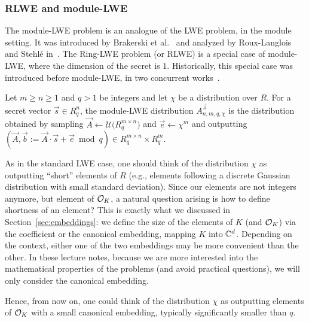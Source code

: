 \subsubsection{RLWE and module-LWE}


The module-LWE problem is an analogue of the LWE problem, in the module setting. It was introduced by Brakerski et al.~\cite{MLWE1} and analyzed by Roux-Langlois and Stehlé in~\cite{MLWE2}. The Ring-LWE problem (or RLWE) is a special case of module-LWE, where the dimension of the secret is $1$. Historically, this special case was introduced before module-LWE, in two concurrent works~\cite{RLWE1, RLWE2}.

\begin{definition}
Let $m \geq n \geq 1$ and $q > 1$ be integers and let $\chi$ be a distribution over $R$. For a secret vector $\vec s \in R_q^n$, the module-LWE distribution $A^{\vec s}_{n,m,q,\chi}$ is the distribution obtained by sampling $\vec A \leftarrow \mathcal{U}\Big(R_q^{m \times n}\Big)$ and $\vec e \leftarrow \chi^m$ and outputting $(\vec A, \vec b := \vec A \cdot \vec s + \vec e \bmod q) \in R_q^{m \times n} \times R_q^m$.
\end{definition}


As in the standard LWE case, one should think of the distribution $\chi$ as outputting ``short'' elements of $R$ (e.g., elements following a discrete Gaussian distribution with small standard deviation). Since our elements are not integers anymore, but element of $\mathcal{O}_K$, a natural question arising is how to define shortness of an element? This is exactly what we discussed in Section~\ref{sec:embeddings}: we define the size of the elements of $K$ (and $\mathcal{O}_K$) via the coefficient or the canonical embedding, mapping $K$ into $\mathbb{C}^d$. Depending on the context, either one of the two embeddings may be more convenient than the other. In these lecture notes, because we are more interested into the mathematical properties of the problems (and avoid practical questions), we will only consider the canonical embedding.

Hence, from now on, one could think of the distribution $\chi$ as outputting elements of $\mathcal{O}_K$ with a small canonical embedding, typically significantly smaller than $q$.

